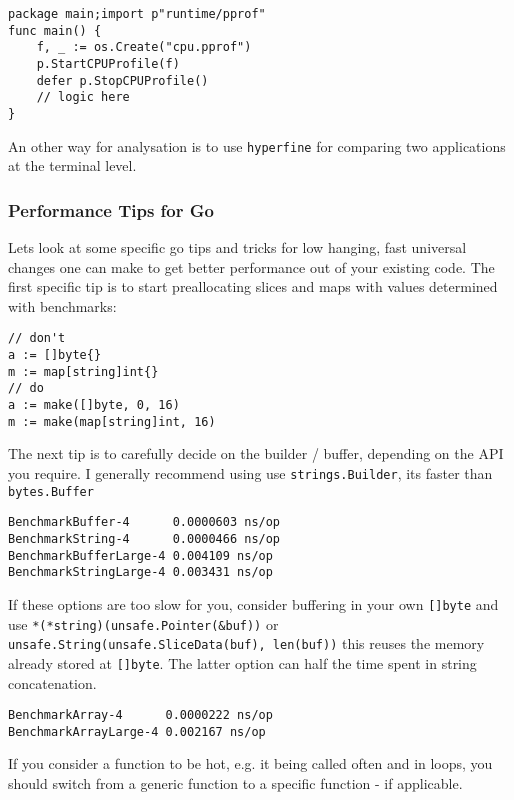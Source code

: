     \begin{verbatim}
package main;import p"runtime/pprof"
func main() {
    f, _ := os.Create("cpu.pprof")
    p.StartCPUProfile(f)
    defer p.StopCPUProfile()
    // logic here
}
    \end{verbatim}

    An other way for analysation is to use \texttt{hyperfine} for comparing two
    applications at the terminal level.

    \subsubsection*{Performance Tips for Go}

    Lets look at some specific go tips and tricks for low hanging, fast
    universal changes one can make to get better performance out of your
    existing code. The first
    specific tip is to start preallocating slices and maps with values
    determined with benchmarks:

    \begin{verbatim}
// don't
a := []byte{}
m := map[string]int{}
// do
a := make([]byte, 0, 16)
m := make(map[string]int, 16)
    \end{verbatim}

    The next tip is to carefully decide on the builder / buffer, depending on
    the API you require. I generally recommend using  use
    \texttt{strings.Builder}, its faster than
    \texttt{bytes.Buffer} 

    \begin{verbatim}
BenchmarkBuffer-4      0.0000603 ns/op
BenchmarkString-4      0.0000466 ns/op
BenchmarkBufferLarge-4 0.004109 ns/op
BenchmarkStringLarge-4 0.003431 ns/op
    \end{verbatim}

    If these options are too slow for you, consider buffering in your own
    \texttt{[]byte} and use
    \texttt{*(*string)(unsafe.Pointer(&buf))} or
    \texttt{unsafe.String(unsafe.SliceData(buf), len(buf))} this reuses
    the memory already stored at \texttt{[]byte}. The latter option can
    half the time spent in string concatenation.

    \begin{verbatim}
BenchmarkArray-4      0.0000222 ns/op
BenchmarkArrayLarge-4 0.002167 ns/op
    \end{verbatim}

    If you consider a function to be hot, e.g. it being called often and in
    loops, you should switch from a generic function to a specific function -
    if applicable.

